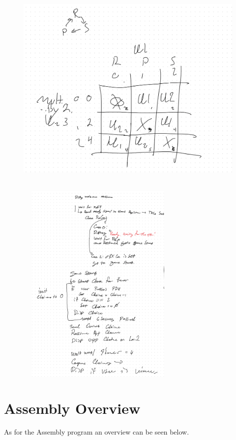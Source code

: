 \documentclass[12pt,letterpaper]{article}
\begin{document}
\begin{figure}[h]
	\centering
	\includegraphics[width=12cm, height=10cm]{boxBreakdown.png}

\end{figure}

\begin{figure}[h]
	\centering
	\includegraphics[width=8cm, height=10cm]{flowchart.png}
	\linebreak
\end{figure}

\section{Assembly Overview}
As for the Assembly program an overview can be seen below. 
\end{document}
